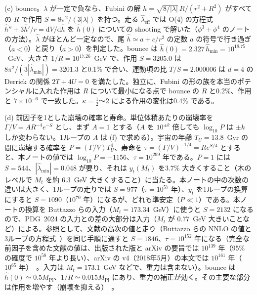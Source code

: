\documentclass[a4paper,10pt]{ltjsarticle}
\newcommand{\dd}{\mathrm{d}}
\begin{document}
(c) bounce。$\lambda$ が一定で負なら、Fubini の解 $h=\sqrt{8/|\lambda|}\,R/(r^2+R^2)$ がすべての $R$ で作用 $S=8\pi^2/(3|\lambda|)$ を持つ。走る $\hat\lambda_{\mathrm{eff}}$ では O(4) の方程式 $\hat h''+3\hat h'/r=\dd V/\dd\hat h$ を $\hat h(0)$ についての shooting で解いた（$\phi^3+\phi^4$ のノート~\cite{phi34note} の方法）。$\hat\lambda$ がほとんど一定なので、尾 $\hat h\simeq a+c/r^2$ の定数 $a$ の符号で行き過ぎ（$a<0$）と戻り（$a>0$）を判定した。bounce は $\hat h(0)=2.327\,\hat h_{\min}=10^{18.75}$~GeV、大きさ $1/R=10^{17.26}$~GeV で、作用 $S=3205.0$ は $8\pi^2/(3|\hat\lambda_{\min}|)=3201.3$ と0.1\% で合い、運動項の比 $T/S=2.000006$ は $d=4$ の Derrick の関係 $2T+4U=0$ を満たした。独立に、Fubini の形の族を本当のポテンシャルに入れた作用は $R$ について最小になる点で bounce の $R$ と0.2\%、作用と $7\times10^{-6}$ で一致した。$\kappa=\frac12$〜2 による作用の変化は0.4\% である。

(d) 前因子を1とした崩壊の確率と寿命。単位体積あたりの崩壊率を $\Gamma/V=AR^{-4}e^{-S}$ とし、まず $A=1$ とする（$A$ を $10^{\pm k}$ 倍しても $\log_{10}P$ は $\pm k$ しか変わらない。1ループの $A$ は (f) で求める）。宇宙の年齢 $T_U=13.8$~Gyr の間に崩壊する確率を $P=(\Gamma/V)T_U^4$、寿命を $\tau=(\Gamma/V)^{-1/4}=Re^{S/4}$ とすると、本ノートの値では $\log_{10}P=-1156$、$\tau=10^{299}$ 年である。$P=1$ には $S=544$、$|\hat\lambda_{\min}|=0.048$ が要り、それは $y_t(M_t)$ を3.7\% 大きくすること（木のレベルで $M_t$ を約 6.3~GeV 大きくすること）に当たる。本ノートの中の次数の違いは大きく、1ループの走りでは $S=977$（$\tau=10^{57}$ 年）、$y_t$ を1ループの換算にすると $S=1090$（$10^{70}$ 年）になるが、どれも準安定（$P\ll1$）である。本ノートの換算を Buttazzo らの入力（$M_t=173.34$~GeV）に使うと $S=2132$ になるので、PDG~2024 の入力との差の大部分は入力（$M_t$ が 0.77~GeV 大きいことなど）による。参照として、文献の高次の値と走り（Buttazzo らの NNLO の値と3ループの方程式~\cite{buttazzo13}）を同じ手順に通すと $S=1846$、$\tau=10^{152}$ 年になる（完全な前因子を含めた文献の値は、出版された版と arXiv の要旨では $10^{139}$ 年（95\% の確度で $10^{58}$ 年より長い）、arXiv の v4（2018年5月）の本文では $10^{161}$ 年（$10^{65}$ 年）~\cite{afs18}。入力は $M_t=173.1$~GeV などで、重力は含まない）。bounce は $\hat h(0)\simeq0.5M_{\mathrm{Pl}}$、$1/R\simeq0.015M_{\mathrm{Pl}}$ にあり、重力の補正が効く。その主要な部分は作用を増やす（崩壊を抑える）~\cite{irst08,sstu16}。
\end{document}
